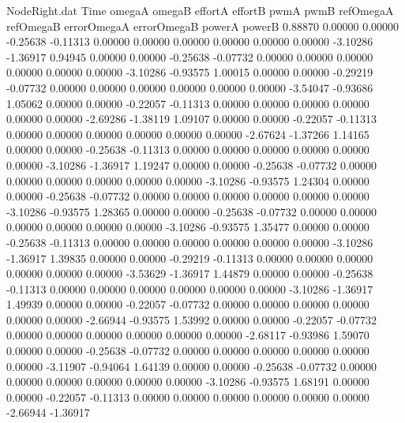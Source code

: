 \begin{filecontents}{NodeRight.dat}
Time omegaA omegaB effortA effortB pwmA pwmB refOmegaA refOmegaB errorOmegaA errorOmegaB powerA powerB
   0.88870    0.00000    0.00000    -0.25638   -0.11313    0.00000    0.00000    0.00000    0.00000    0.00000    0.00000   -3.10286   -1.36917
   0.94945    0.00000    0.00000    -0.25638   -0.07732    0.00000    0.00000    0.00000    0.00000    0.00000    0.00000   -3.10286   -0.93575
   1.00015    0.00000    0.00000    -0.29219   -0.07732    0.00000    0.00000    0.00000    0.00000    0.00000    0.00000   -3.54047   -0.93686
   1.05062    0.00000    0.00000    -0.22057   -0.11313    0.00000    0.00000    0.00000    0.00000    0.00000    0.00000   -2.69286   -1.38119
   1.09107    0.00000    0.00000    -0.22057   -0.11313    0.00000    0.00000    0.00000    0.00000    0.00000    0.00000   -2.67624   -1.37266
   1.14165    0.00000    0.00000    -0.25638   -0.11313    0.00000    0.00000    0.00000    0.00000    0.00000    0.00000   -3.10286   -1.36917
   1.19247    0.00000    0.00000    -0.25638   -0.07732    0.00000    0.00000    0.00000    0.00000    0.00000    0.00000   -3.10286   -0.93575
   1.24304    0.00000    0.00000    -0.25638   -0.07732    0.00000    0.00000    0.00000    0.00000    0.00000    0.00000   -3.10286   -0.93575
   1.28365    0.00000    0.00000    -0.25638   -0.07732    0.00000    0.00000    0.00000    0.00000    0.00000    0.00000   -3.10286   -0.93575
   1.35477    0.00000    0.00000    -0.25638   -0.11313    0.00000    0.00000    0.00000    0.00000    0.00000    0.00000   -3.10286   -1.36917
   1.39835    0.00000    0.00000    -0.29219   -0.11313    0.00000    0.00000    0.00000    0.00000    0.00000    0.00000   -3.53629   -1.36917
   1.44879    0.00000    0.00000    -0.25638   -0.11313    0.00000    0.00000    0.00000    0.00000    0.00000    0.00000   -3.10286   -1.36917
   1.49939    0.00000    0.00000    -0.22057   -0.07732    0.00000    0.00000    0.00000    0.00000    0.00000    0.00000   -2.66944   -0.93575
   1.53992    0.00000    0.00000    -0.22057   -0.07732    0.00000    0.00000    0.00000    0.00000    0.00000    0.00000   -2.68117   -0.93986
   1.59070    0.00000    0.00000    -0.25638   -0.07732    0.00000    0.00000    0.00000    0.00000    0.00000    0.00000   -3.11907   -0.94064
   1.64139    0.00000    0.00000    -0.25638   -0.07732    0.00000    0.00000    0.00000    0.00000    0.00000    0.00000   -3.10286   -0.93575
   1.68191    0.00000    0.00000    -0.22057   -0.11313    0.00000    0.00000    0.00000    0.00000    0.00000    0.00000   -2.66944   -1.36917

\end{filecontents}
